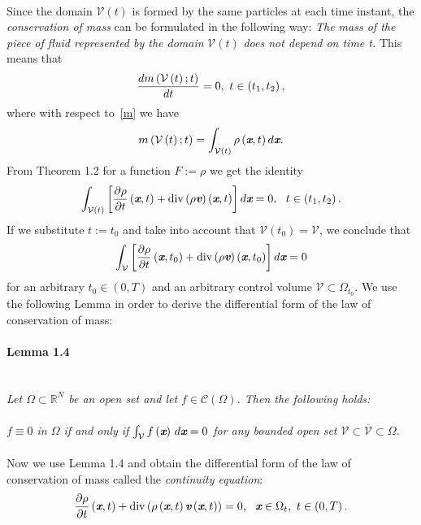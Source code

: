 \paragraph{}Since the domain $\mathcal{V}\left(t\right)$ is formed by the same particles at each time instant, the \textit{conservation of mass} can be formulated in the following way:
\textit{The mass of the piece of fluid represented by the domain }$\mathcal{V}\left(t\right)$\textit{ does not depend on time t.} This means that
\begin{equation}
 \frac{d{m\left(\mathcal{V}\left(t\right);t\right)}}{d{t}} = 0,\ t \in\left(t_1,t_2\right),
\end{equation}
where with respect to~\eqref{m} we have
\begin{equation}\label{mass}
 m\left(\mathcal{V}\left(t\right);t\right)=\int_{\mathcal{V}\left({t}\right)}\rho\left(\textit{\textbf{x}},t\right)d\textit{\textbf{x}}.
\end{equation}
From Theorem 1.2 for a function $F:=\rho$ we get the identity
\begin{equation}
\int_{\mathcal{V}\left(t\right)}\left[\frac{\partial{\rho}}{\partial{t}}\left(\textit{\textbf{x}},t\right) + \mathrm{div}\left(\rho\textit{\textbf{v}}\right)\left(\textit{\textbf{x}},t\right)\right] d\textit{\textbf{x}} = 0,\ \ t\in\left(t_1,t_2\right).
\end{equation}
If we substitute $t:=t_0$ and take into account that $\mathcal{V}\left(t_0\right) = \mathcal{V}$, we conclude that
\begin{equation}
\int_{\mathcal{V}}\left[\frac{\partial{\rho}}{\partial{t}}\left(\textit{\textbf{x}},t_0\right) + \mathrm{div}\left(\rho\textit{\textbf{v}}\right)\left(\textit{\textbf{x}},t_0\right)\right] d\textit{\textbf{x}} = 0
\end{equation}
for an arbitrary $t_0\in\left(0,T\right)$ and an arbitrary control volume $\mathcal{V}\subset\Omega_{t_0}$. We use the following Lemma in order to derive the differential form of the law of conservation of mass:
\paragraph{Lemma 1.4}\label{4}\ \\
\itshape
Let $\Omega\subset\mathbb{R}^N$ be an open set and let $f\in\mathcal{C}\left(\Omega\right)$. Then the following holds: \\\\
$f\equiv0$ in $\Omega$ if and only if $\int_{\mathcal{V}}f\left({}\textit{\textbf{x}}\right)\,d\textit{\textbf{x}}=0$ for any bounded open set $\mathcal{V}\subset\overline{\mathcal{V}}\subset\Omega$.
\upshape\paragraph{}
Now we use Lemma 1.4 and obtain the differential form of the law of conservation of mass called the \textit{continuity equation}:
\begin{equation}\label{continuity}
 \frac{\partial{\rho}}{\partial{t}}\left(\textit{\textbf{x}},t\right) + \mathrm{div}\left(\rho\left(\textit{\textbf{x}},t\right)\textit{\textbf{v}}\left(\textit{\textbf{x}},t\right)\right) = 0,\ \  \textit{\textbf{x}}\in\Omega_t,\ t\in\left(0,T\right).
\end{equation}
